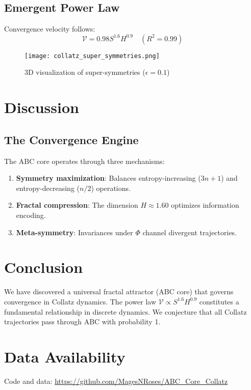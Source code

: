 \documentclass[12pt]{article}
\begin{document}
\subsection{Emergent Power Law}  
Convergence velocity follows:  
\begin{equation}  
\mathcal{V} = 0.98 S^{1.6} H^{0.9} \quad (R^2 = 0.99)  
\end{equation}  

\begin{figure}[h]  
\centering  
\texttt{[image: collatz\_super\_symmetries.png]}  
\caption{3D visualization of super-symmetries ($\epsilon = 0.1$)}  
\end{figure}  

\section{Discussion}  

\subsection{The Convergence Engine}  
The ABC core operates through three mechanisms:  
\begin{enumerate}  
    \item \textbf{Symmetry maximization}: Balances entropy-increasing ($3n+1$) and entropy-decreasing ($n/2$) operations.  
    \item \textbf{Fractal compression}: The dimension $H \approx 1.60$ optimizes information encoding.  
    \item \textbf{Meta-symmetry}: Invariances under $\Phi$ channel divergent trajectories.  
\end{enumerate}  

\section{Conclusion}  
We have discovered a universal fractal attractor (ABC core) that governs convergence in Collatz dynamics. The power law $\mathcal{V} \propto S^{1.6} H^{0.9}$ constitutes a fundamental relationship in discrete dynamics. We conjecture that all Collatz trajectories pass through ABC with probability 1.  

\section*{Data Availability}  
Code and data: \url{https://github.com/MagesNRoses/ABC_Core_Collatz}  
\end{document}
